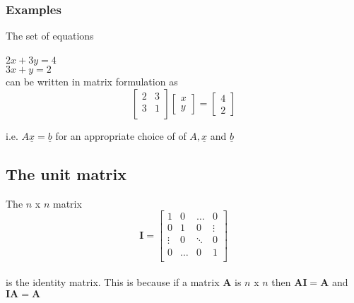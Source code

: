 \documentclass[12pt,a4paper]{article}
\theoremstyle{regla}
\theoremstyle{remark}
\theoremstyle{definition}
\theoremstyle{nonumberbreak}
\begin{document}
\subsubsection{Examples}
\begin{xmpl}
The set of equations\\
\\
$2x+3y=4$ \\
$3x+y=2$ \\

can be written in matrix formulation as\\

$$\begin{bmatrix}
2 & 3  \\
3 & 1  \\
\end{bmatrix}
\begin{bmatrix}
x \\
y
\end{bmatrix}
=
\begin{bmatrix}
4 \\
2
\end{bmatrix}
$$

i.e. $A\underline{x} = \underline{b}$ for an appropriate choice of of $A, \underline{x}$ and $\underline{b}$\\
\end{xmpl}

\subsection{The unit matrix}
\begin{fbox}
\begin{minipage}{0.97\textwidth}
The $n$ x $n$ matrix \\

\begin{equation*}
\mathbf{I}
=
\left[
\begin{array}{cccc}
1 & 0 & \ldots & 0 \\
0 & 1 & 0  & \vdots \\
\vdots & 0  & \ddots & 0 \\
0 & \ldots & 0 & 1 \\
\end{array} \right]
\end{equation*}
\\
is the identity matrix. This is because if a matrix $\mathbf{A}$ is $n$ x $n$ then $\mathbf{A} \mathbf{I} = \mathbf{A}$ and $\mathbf{I} \mathbf{A}  = 
\mathbf{A}$\\
\end{minipage}
\end{fbox}
\end{document}

